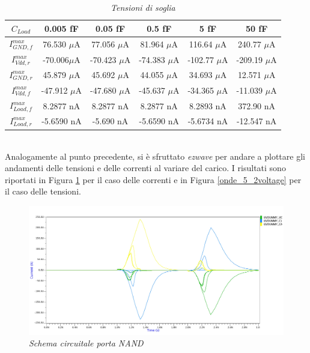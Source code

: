 \begin{table}[!h]\footnotesize
	\centering
	\begin{tabular}{|c|c|c|c|c|c|}
		\hline
		\textbf{$C_{Load}$} & \textbf{0.005 fF} & \textbf{0.05 fF} & \textbf{0.5 fF} & \textbf{5 fF} & \textbf{50 fF}\\
		\hline
		$I_{GND, f}^{max}$ &76.530 $\mu$A &77.056 $\mu$A &81.964 $\mu$A &116.64 $\mu$A &240.77 $\mu$A \\
		
		$I_{Vdd, r}^{max}$ &-70.006$\mu$A &-70.423 $\mu$A &-74.383 $\mu$A &-102.77 $\mu$A &-209.19 $\mu$A \\
		
		$I_{GND, r}^{max}$&45.879 $\mu$A &45.692 $\mu$A &44.055 $\mu$A &34.693 $\mu$A &12.571 $\mu$A\\
		
		$I_{Vdd, f}^{max}$& -47.912 $\mu$A&-47.680 $\mu$A &-45.637 $\mu$A &-34.365 $\mu$A &-11.039 $\mu$A \\
		
		$I_{Load, f}^{max}$ &8.2877 nA &8.2877 nA &8.2877 nA &8.2893 nA &372.90 nA \\
		
		$I_{Load, r}^{max}$ &-5.6590 nA &-5.690 nA &-5.6590 nA &-5.6734 nA &-12.547 nA \\
		\hline
	\end{tabular}
	\caption{\textit{Tensioni di soglia}}
	\label{Tab5_5}
\end{table}
\\
Analogamente al punto precedente, si è sfruttato \textit{ezwave} per andare a plottare gli andamenti delle tensioni e delle correnti al variare del carico. I risultati sono riportati in Figura \ref{onde_5_2current} per il caso delle correnti e in Figura \ref{onde_5_2voltage} per il caso delle tensioni.\\
\begin{figure}[!htb]
	\centering
	\includegraphics[scale=0.09]{immagini/onde_5_2current}
	\caption{\textit{Schema circuitale porta NAND}}
	\label{onde_5_2current}
\end{figure}
